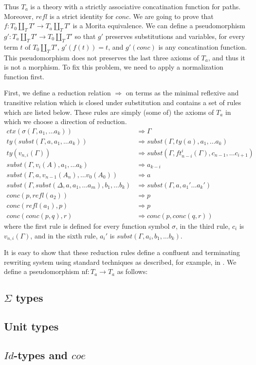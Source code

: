 \documentclass[reqno]{amsart}
\theoremstyle{definition}
\theoremstyle{remark}
\newcommand{\nf}{\mathrm{nf}}
\newcommand{\red}{\Rightarrow}
\newcommand{\Id}{\mathit{Id}}
\newcommand{\coe}{\mathit{coe}}
\newcommand{\conc}{\mathit{conc}}
\newcommand{\refl}{\mathit{refl}}
\newcommand{\subst}{\mathit{subst}}
\numberwithin{figure}{section}
\begin{document}
Thus $T_a$ is a theory with a strictly associative concatination function for paths.
Moreover, $\refl$ is a strict identity for $\conc$.
We are going to prove that $f : T_0 \amalg_T T' \to T_a \amalg_T T'$ is a Morita equivalence.
We can define a pseudomorphism $g' : T_a \amalg_T T' \to T_0 \amalg_T T'$ so that $g'$ preserves substitutions and variables,
for every term $t$ of $T_0 \amalg_T T'$, $g'(f(t)) = t$, and $g'(\conc)$ is any concatination function.
This pseudomorphism does not preserves the last three axioms of $T_a$, and thus it is not a morphism.
To fix this problem, we need to apply a normalization function first.

First, we define a reduction relation $\red$ on terms as the minimal reflexive and transitive relation
which is closed under substitution and contains a set of rules which are listed below.
These rules are simply (some of) the axioms of $T_a$ in which we choose a direction of reduction.
\begin{align*}
ctx(\sigma(\Gamma, a_1, \ldots a_k)) & \red \Gamma \\
ty(\subst(\Gamma, a, a_1, \ldots a_k)) & \red \subst(\Gamma, ty(a), a_1, \ldots a_k) \\
ty(v_{n,i}(\Gamma)) & \red \subst(\Gamma, ft^i_{n-i}(\Gamma), c_{n-1}, \ldots c_{i+1}) \\
\subst(\Gamma, v_i(A), a_1, \ldots a_k) & \red a_{k-i} \\
\subst(\Gamma, a, v_{n-1}(A_n), \ldots v_0(A_0)) & \red a \\
\subst(\Gamma, \subst(\Delta, a, a_1, \ldots a_m), b_1, \ldots b_k) & \red \subst(\Gamma, a, a_1' \ldots a_k') \\
\conc(p,\refl(a_2)) & \red p \\
\conc(\refl(a_1),p) & \red p \\
\conc(\conc(p,q),r) & \red \conc(p,\conc(q,r))
\end{align*}
where the first rule is defined for every function symbol $\sigma$,
in the third rule, $c_i$ is $v_{n,i}(\Gamma)$,
and in the sixth rule, $a_i'$ is $\subst(\Gamma, a_i, b_1, \ldots b_k)$.

It is easy to show that these reduction rules define a confluent and terminating rewriting system using standard techniques as described, for example, in \cite{Terese}.
We define a pseudomorphism $\nf : T_a \to T_a$ as follows:

\subsection{$\Sigma$ types}

\subsection{Unit types}

\subsection{$\Id$-types and $\coe$}



\end{document}
